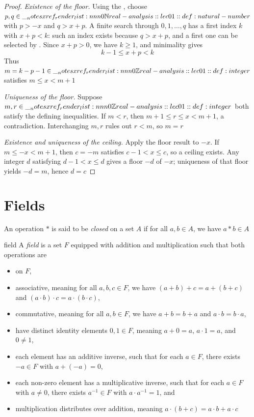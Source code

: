 \documentclass[12pt]{article}
\begin{document}
\begin{proof}
  \emph{Existence of the floor.} Using the
  ,
  choose \(p,q\in\NN\) with \(p>-x\) and \(q>x+p\). A finite search
  through \(0,1,\ldots,q\) has a first index \(k\) with \(x+p<k\):
  such an index exists because \(q>x+p\), and a first one can be selected
  by .
  Since \(x+p>0\), we have \(k\geq1\), and minimality gives
  \[
    k-1\leq x+p<k
  \]
  Thus \(m=k-p-1\in\ZZ\) satisfies \(m\leq x<m+1\)

  \emph{Uniqueness of the floor.} Suppose \(m,r\in\ZZ\) both satisfy
  the defining inequalities. If \(m<r\), then
  \(m+1\leq r\leq x<m+1\), a contradiction. Interchanging \(m,r\)
  rules out \(r<m\), so \(m=r\)

  \emph{Existence and uniqueness of the ceiling.} Apply the floor result to
  \(-x\). If \(m\leq -x<m+1\), then \(c=-m\) satisfies
  \(c-1<x\leq c\), so a ceiling exists. Any integer \(d\) satisfying
  \(d-1<x\leq d\) gives a floor \(-d\) of \(-x\); uniqueness of that
  floor yields \(-d=m\), hence \(d=c\)
\end{proof}

\section{Fields}

\begin{dfn}
An operation $\ast$ is said to be \emph{closed} on a set $A$ if for all $a,b \in A$, we have $a \ast b \in A$
\end{dfn}

\begin{dfn}[Field]{field}
A \emph{field} is a set \(F\) equipped with addition and multiplication such that both operations are
\begin{itemize}[nosep]
  \item {} on \(F\),
  \item associative, meaning for all \(a,b,c \in F\), we have \((a + b) + c = a + (b + c)\) and \((a \cdot b) \cdot c = a \cdot (b \cdot c)\), 
  \item commutative, meaning for all \(a,b \in F\), we have \(a + b = b + a\) and \(a \cdot b = b \cdot a\), 
  \item have distinct identity elements \(0,1\in F\), meaning
    \(a+0=a\), \(a\cdot1=a\), and \(0\neq1\),
  \item each element has an additive inverse, such that for each \(a \in F\), there exists \(-a \in F\) with \(a + (-a) = 0\), 
  \item each non-zero element has a multiplicative inverse, such that for each \(a \in F\) with \(a \neq 0\), there exists \(a^{-1} \in F\) with \(a \cdot a^{-1} = 1\), and
  \item multiplication distributes over addition, meaning
    \(a\cdot(b+c)=a\cdot b+a\cdot c\)
\end{itemize}
\end{dfn}
\end{document}
